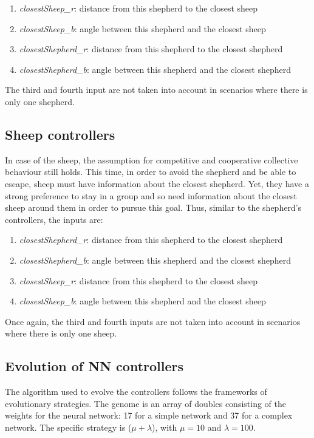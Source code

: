 \documentclass[conference]{IEEEtran}
\begin{document}
\begin{enumerate}
	\item \textit{closestSheep\_r}: distance from this shepherd to the closest sheep
	\item \textit{closestSheep\_b}: angle between this shepherd and the closest sheep 
	\item \textit{closestShepherd\_r}: distance from this shepherd to the closest shepherd
	\item \textit{closestShepherd\_b}: angle between this shepherd and the closest shepherd
\end{enumerate}

The third and fourth input are not taken into account in scenarios where there is only one shepherd. 

\subsection{Sheep controllers}
In case of the sheep, the assumption for competitive and cooperative collective behaviour still holds. This time, in order to avoid the shepherd and be able to escape, sheep must have information about the closest shepherd. Yet, they have a strong preference to stay in a group and so need information about the closest sheep around them in order to pursue this goal. Thus, similar to the shepherd's controllers, the inputs are:

\begin{enumerate}
	\item \textit{closestShepherd\_r}: distance from this shepherd to the closest shepherd
	\item \textit{closestShepherd\_b}: angle between this shepherd and the closest shepherd
	\item \textit{closestSheep\_r}: distance from this shepherd to the closest sheep
	\item \textit{closestSheep\_b}: angle between this shepherd and the closest sheep
\end{enumerate}

Once again, the third and fourth inputs are not taken into account in scenarios where there is only one sheep. 

\subsection{Evolution of NN controllers}
The algorithm used to evolve the controllers follows the frameworks of evolutionary strategies. The genome is an array of doubles consisting of the weights for the neural network: 17 for a simple network and 37 for a complex network. The specific strategy is ($\mu + \lambda$), with $\mu = 10$ and $\lambda = 100$. 
\end{document}
